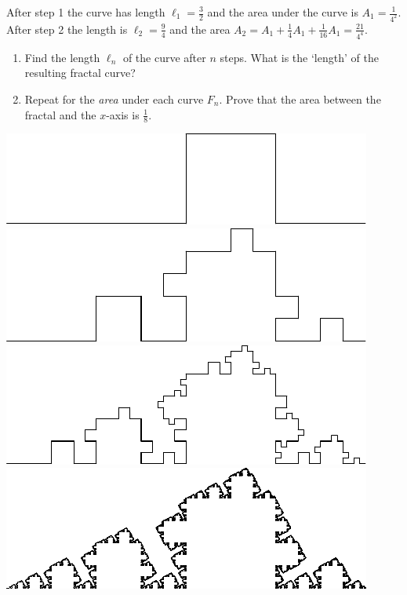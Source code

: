 \begin{exercises}{}{}
\begin{enumerate}
\begin{enumerate}
\begin{minipage}[t]{0.62\linewidth}
	    After step 1 the curve has length $\ell_1=\frac 32$ and the area under the curve is $A_1=\frac 1{4^2}$. After step 2 the length is $\ell_2=\frac 94$ and the area $A_2=A_1+\frac 14A_1+\frac 1{16}A_1 =\frac{21}{4^4}$. 
	    \begin{enumerate}\itemsep0pt
	      \item Find the length $\ell_n$ of the curve after $n$ steps. What is the `length' of the resulting fractal curve?
	      \item Repeat for the \emph{area} under each curve $F_n$. Prove that the area between the fractal and the $x$-axis is $\frac 18$.
	    \end{enumerate}
	    \end{minipage}
	    \hfill
	    \begin{minipage}[t]{0.35\linewidth}\vspace{-25pt}
	    \flushright
	    	\includegraphics[scale=0.64]{fractal1}
	    	\\
	    	\includegraphics[scale=0.64]{fractal2}
	    	\\
	    	\includegraphics[scale=0.64]{fractal3}
	    	\\
	    	\includegraphics[scale=0.64]{fractal}
	    \end{minipage}
		\end{enumerate}



\end{enumerate}
\end{exercises}
